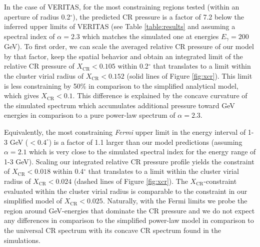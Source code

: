 \documentclass[12pt,manuscript]{aastex}
\newcommand{\CR}{\mathrm{CR}}
\begin{document}
In the case of VERITAS, for the most constraining regions tested (within an aperture of radius
0.2$^{\circ}$), the predicted CR pressure is a factor of 7.2 below the inferred upper limits of VERITAS
(see Table
\ref{table:results} and assuming a spectral index of $\alpha=2.3$ which matches the simulated one at
energies $E_\gamma=200$ GeV). To first order, we can scale the averaged relative CR pressure of
our model by that
factor, keep the spatial behavior and obtain an integrated limit of the relative CR pressure of
$X_{\CR}<0.105$ within 0.2$^{\circ}$ that translates to a limit within the cluster virial radius of
$X_\CR<0.152$ (solid lines of Figure \ref{fig:xcr}).  This limit is less constraining by 50\% in
comparison to the simplified analytical model, which gives $X_\CR<0.1$. This difference is
explained by the concave curvature of the simulated spectrum which accumulates additional pressure
toward GeV energies in comparison to a pure power-law spectrum of $\alpha=2.3$.

Equivalently, the most constraining {\em Fermi} upper limit in the energy interval of 1-3 GeV
($<0.4^\circ$) is a factor of 1.1 larger than our model predictions (assuming $\alpha=2.1$ which is
very close to the simulated spectral index for the energy range of 1-3 GeV). Scaling our integrated
relative CR pressure profile yields the constraint of $X_{\CR}<0.018$ within 0.4$^{\circ}$ that
translates to a limit within the cluster virial radius of $X_\CR<0.024$ (dashed lines of Figure
\ref{fig:xcr}).  The $X_\CR$-constraint evaluated within the cluster virial radius is comparable to
the constraint in our simplified model of $X_\CR<0.025$.  Naturally, with the Fermi limits we probe
the region around GeV-energies that dominate the CR pressure and we do not expect any differences in
comparison to the simplified power-law model in comparison to the universal CR spectrum with its
concave CR spectrum found in the simulations.

%
%
\end{document}
